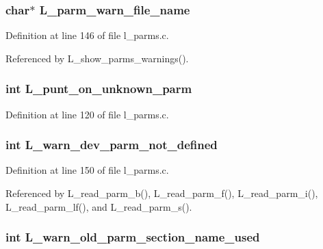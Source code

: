 \subsubsection{\setlength{\rightskip}{0pt plus 5cm}char$\ast$ \bf{L\_\-parm\_\-warn\_\-file\_\-name}}\label{l__parms_8h_a52c8258549d23615859be45e5f2a38c}




Definition at line 146 of file l\_\-parms.c.

Referenced by L\_\-show\_\-parms\_\-warnings().
\subsubsection{\setlength{\rightskip}{0pt plus 5cm}int \bf{L\_\-punt\_\-on\_\-unknown\_\-parm}}\label{l__parms_8h_38db30290d33f5904a0c1859d7ae7d21}




Definition at line 120 of file l\_\-parms.c.
\subsubsection{\setlength{\rightskip}{0pt plus 5cm}int \bf{L\_\-warn\_\-dev\_\-parm\_\-not\_\-defined}}\label{l__parms_8h_e4e406bd7aa9be4a24b2a33ea728e4db}




Definition at line 150 of file l\_\-parms.c.

Referenced by L\_\-read\_\-parm\_\-b(), L\_\-read\_\-parm\_\-f(), L\_\-read\_\-parm\_\-i(), L\_\-read\_\-parm\_\-lf(), and L\_\-read\_\-parm\_\-s().
\subsubsection{\setlength{\rightskip}{0pt plus 5cm}int \bf{L\_\-warn\_\-old\_\-parm\_\-section\_\-name\_\-used}}\label{l__parms_8h_a6c1f01f3f17239261b3d73364478201}




